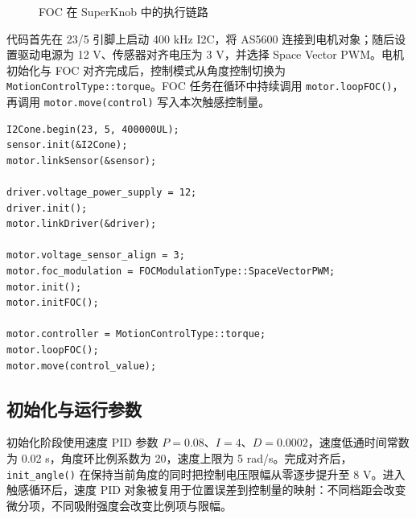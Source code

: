 \begin{figure}[H]
\centering
{}
\caption{FOC 在 SuperKnob 中的执行链路}
\label{fig:foc-chain}
\end{figure}

代码首先在 23/5 引脚上启动 400 kHz I2C，将 AS5600 连接到电机对象；随后设置驱动电源为 12 V、传感器对齐电压为 3 V，并选择 Space Vector PWM。电机初始化与 FOC 对齐完成后，控制模式从角度控制切换为 \texttt{MotionControlType::torque}。FOC 任务在循环中持续调用 \texttt{motor.loopFOC()}，再调用 \texttt{motor.move(control)} 写入本次触感控制量。

\begin{lstlisting}[caption={FOC 初始化的核心代码结构},label={lst:foc-init}]
I2Cone.begin(23, 5, 400000UL);
sensor.init(&I2Cone);
motor.linkSensor(&sensor);

driver.voltage_power_supply = 12;
driver.init();
motor.linkDriver(&driver);

motor.voltage_sensor_align = 3;
motor.foc_modulation = FOCModulationType::SpaceVectorPWM;
motor.init();
motor.initFOC();

motor.controller = MotionControlType::torque;
motor.loopFOC();
motor.move(control_value);
\end{lstlisting}

\subsection{初始化与运行参数}

初始化阶段使用速度 PID 参数 $P=0.08$、$I=4$、$D=0.0002$，速度低通时间常数为 0.02 s，角度环比例系数为 20，速度上限为 5 rad/s。完成对齐后，\texttt{init\_angle()} 在保持当前角度的同时把控制电压限幅从零逐步提升至 8 V。进入触感循环后，速度 PID 对象被复用于位置误差到控制量的映射：不同档距会改变微分项，不同吸附强度会改变比例项与限幅。


